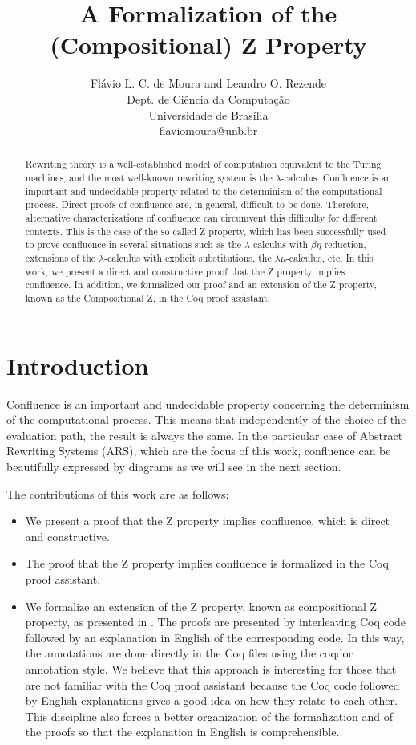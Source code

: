 \documentclass[a4paper]{article}
\title{A Formalization of the (Compositional) Z Property}
\author{
Flávio L. C. de Moura and Leandro O. Rezende\\ Dept. de Ciência da Computação\\
                Universidade de Brasília \\ flaviomoura@unb.br
}
\begin{document}
\maketitle

\begin{abstract}
  Rewriting theory is a well-established model of computation
  equivalent to the Turing machines, and the most well-known rewriting
  system is the $\lambda$-calculus. Confluence is an important and
  undecidable property related to the determinism of the computational
  process. Direct proofs of confluence are, in general, difficult to
  be done. Therefore, alternative characterizations of confluence can
  circumvent this difficulty for different contexts. This is the case
  of the so called Z property, which has been successfully used to
  prove confluence in several situations such as the
  $\lambda$-calculus with $\beta\eta$-reduction, extensions of the
  $\lambda$-calculus with explicit substitutions, the
  $\lambda\mu$-calculus, etc. In this work, we present a direct and
  constructive proof that the Z property implies confluence.  In
  addition, we formalized our proof and an extension of the Z
  property, known as the Compositional Z, in the Coq proof assistant.
\end{abstract}
\vskip 32pt


\section{Introduction}

Confluence is an important and undecidable property concerning the
determinism of the computational process. This means that
independently of the choice of the evaluation path, the result is
always the same. In the particular case of Abstract Rewriting Systems
(ARS), which are the focus of this work, confluence can be beautifully
expressed by diagrams as we will see in the next section.

The contributions of this work are as follows:
\begin{itemize}
\item We present a proof that the Z property implies confluence,
  which is direct and constructive.
\item The proof that the Z property implies confluence is formalized
  in the Coq proof assistant. 
\item We formalize an extension of the Z property, known as
  compositional Z property, as presented in
  \cite{nakazawaCompositionalConfluenceProofs2016}. The proofs are presented by interleaving
  Coq code followed by an explanation in English of the corresponding
  code. In this way, the annotations are done directly in the Coq
  files using the coqdoc annotation style. We believe that this
  approach is interesting for those that are not familiar with the Coq
  proof assistant because the Coq code followed by English
  explanations gives a good idea on how they relate to each
  other. This discipline also forces a better organization of the
  formalization and of the proofs so that the explanation in English
  is comprehensible.
\end{itemize}
\end{document}

